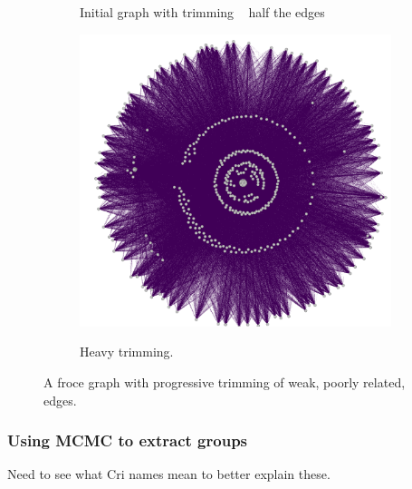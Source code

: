 \begin{figure}[H]
\begin{subfigure}{.33\textwidth}
  \label{fig:pca}
  \caption{Initial graph with trimming ~ half the edges}
\end{subfigure}%
\begin{subfigure}{.33\textwidth}
  \centering
  \includegraphics[width=\textwidth]{fig/step3.png}
  \label{fig:ae}
  \caption{Heavy trimming.}
\end{subfigure}%


\caption{A froce graph with progressive trimming of weak, poorly related, edges.}
\end{figure}

\subsubsection{Using MCMC to extract groups}

Need to see what Cri names mean to better explain these. 

